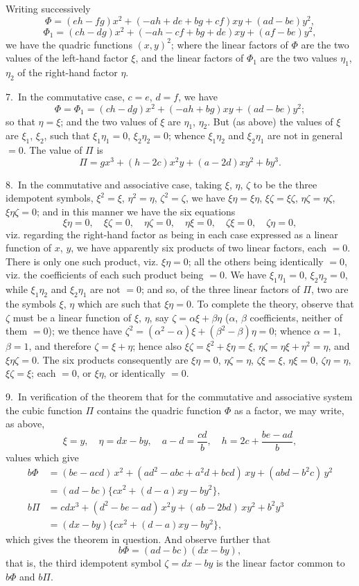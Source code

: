\documentclass[11pt,a4paper]{book}
\begin{document}
Writing successively
\[
\Phi = (eh-fg)x^2 + (-ah+de+bg+cf)xy + (ad-be)y^2,
\]
\[
\Phi_1 = (ch-dg)x^2 + (-ah-cf+bg+de)xy + (af-be)y^2,
\]
we have the quadric functions $(x,y)^2$; where the linear factors of $\Phi$ are the two values of the left-hand factor $\xi$, and the linear factors of $\Phi_1$ are the two values $\eta_1$, $\eta_2$ of the right-hand factor $\eta$.

7.~In the commutative case, $c=e$, $d=f$, we have
\[
\Phi = \Phi_1 = (ch-dg)x^2 + (-ah+bg)xy + (ad-be)y^2;
\]
so that $\eta = \xi$; and the two values of $\xi$ are $\eta_1$, $\eta_2$. But (as above) the values of $\xi$ are $\xi_1$, $\xi_2$, such that $\xi_1\eta_1=0$, $\xi_2\eta_2=0$; whence $\xi_1\eta_2$ and $\xi_2\eta_1$ are not in general $=0$. The value of $\Pi$ is
\[
\Pi = gx^3 + (h-2c)x^2y + (a-2d)xy^2 + by^3.
\]

8.~In the commutative and associative case, taking $\xi$, $\eta$, $\zeta$ to be the three idempotent symbols, $\xi^2=\xi$, $\eta^2=\eta$, $\zeta^2=\zeta$, we have $\xi\eta=\xi\eta$, $\xi\zeta=\xi\zeta$, $\eta\zeta=\eta\zeta$, $\xi\eta\zeta=0$; and in this manner we have the six equations
\[
\xi\eta=0,\quad \xi\zeta=0,\quad \eta\zeta=0,\quad \eta\xi=0,\quad \zeta\xi=0,\quad \zeta\eta=0,
\]
viz. regarding the right-hand factor as being in each case expressed as a linear function of $x$, $y$, we have apparently six products of two linear factors, each $=0$. There is only one such product, viz. $\xi\eta=0$; all the others being identically $=0$, viz. the coefficients of each such product being $=0$. We have $\xi_1\eta_1=0$, $\xi_2\eta_2=0$, while $\xi_1\eta_2$ and $\xi_2\eta_1$ are not $=0$; and so, of the three linear factors of $\Pi$, two are the symbols $\xi$, $\eta$ which are such that $\xi\eta=0$. To complete the theory, observe that $\zeta$ must be a linear function of $\xi$, $\eta$, say $\zeta=\alpha\xi+\beta\eta$ ($\alpha$, $\beta$ coefficients, neither of them $=0$); we thence have $\zeta^2=(\alpha^2-\alpha)\xi+(\beta^2-\beta)\eta=0$; whence $\alpha=1$, $\beta=1$, and therefore $\zeta=\xi+\eta$; hence also $\xi\zeta=\xi^2+\xi\eta=\xi$, $\eta\zeta=\eta\xi+\eta^2=\eta$, and $\xi\eta\zeta=0$. The six products consequently are $\xi\eta=0$, $\eta\zeta=\eta$, $\zeta\xi=\xi$, $\eta\xi=0$, $\zeta\eta=\eta$, $\xi\zeta=\xi$; each $=0$, or $\xi\eta$, or identically $=0$.

9.~In verification of the theorem that for the commutative and associative system the cubic function $\Pi$ contains the quadric function $\Phi$ as a factor, we may write, as above,
\[
\xi = y,\quad \eta = dx - by,\quad a-d = \frac{cd}{b},\quad h = 2c + \frac{be-ad}{b},
\]
values which give
\begin{align*}
b\Phi &= (be-acd)\,x^2 + (ad^2-abc+a^2d+bcd)\,xy + (abd-b^2c)\,y^2 \\
&= (ad-bc)\{cx^2 + (d-a)xy - by^2\}, \\
b\Pi &= cdx^3 + (d^2-be-ad)\,x^2y + (ab-2bd)\,xy^2 + b^2y^3 \\
&= (dx-by)\{cx^2 + (d-a)xy - by^2\},
\end{align*}
which gives the theorem in question. And observe further that
\[
b\Phi = (ad-bc)(dx-by),
\]
that is, the third idempotent symbol $\zeta = dx-by$ is the linear factor common to $b\Phi$ and $b\Pi$.
\end{document}

